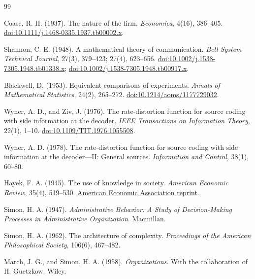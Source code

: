 \documentclass[11pt]{article}
\begin{document}
\begin{thebibliography}{99}

Coase, R. H. (1937).
\newblock The nature of the firm.
\newblock \emph{Economica}, 4(16), 386--405.
\newblock \href{https://doi.org/10.1111/j.1468-0335.1937.tb00002.x}{doi:10.1111/j.1468-0335.1937.tb00002.x}.

Shannon, C. E. (1948).
\newblock A mathematical theory of communication.
\newblock \emph{Bell System Technical Journal}, 27(3), 379--423; 27(4),
623--656.
\newblock \href{https://doi.org/10.1002/j.1538-7305.1948.tb01338.x}{doi:10.1002/j.1538-7305.1948.tb01338.x};
\href{https://doi.org/10.1002/j.1538-7305.1948.tb00917.x}{doi:10.1002/j.1538-7305.1948.tb00917.x}.

Blackwell, D. (1953).
\newblock Equivalent comparisons of experiments.
\newblock \emph{Annals of Mathematical Statistics}, 24(2), 265--272.
\newblock \href{https://doi.org/10.1214/aoms/1177729032}{doi:10.1214/aoms/1177729032}.

Wyner, A. D., and Ziv, J. (1976).
\newblock The rate-distortion function for source coding with side information
at the decoder.
\newblock \emph{IEEE Transactions on Information Theory}, 22(1), 1--10.
\newblock \href{https://doi.org/10.1109/TIT.1976.1055508}{doi:10.1109/TIT.1976.1055508}.

Wyner, A. D. (1978).
\newblock The rate-distortion function for source coding with side information
at the decoder---II: General sources.
\newblock \emph{Information and Control}, 38(1), 60--80.

Hayek, F. A. (1945).
\newblock The use of knowledge in society.
\newblock \emph{American Economic Review}, 35(4), 519--530.
\newblock \href{https://www.aeaweb.org/aer/top20/35.4.519-530.pdf}{American
Economic Association reprint}.

Simon, H. A. (1947).
\newblock \emph{Administrative Behavior: A Study of Decision-Making Processes
in Administrative Organization}.
\newblock Macmillan.

Simon, H. A. (1962).
\newblock The architecture of complexity.
\newblock \emph{Proceedings of the American Philosophical Society}, 106(6),
467--482.

March, J. G., and Simon, H. A. (1958).
\newblock \emph{Organizations}.
\newblock With the collaboration of H. Guetzkow. Wiley.


\end{thebibliography}
\end{document}
